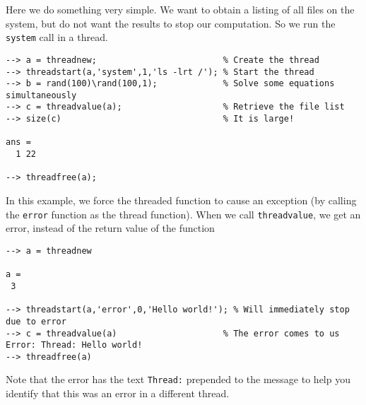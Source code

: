 Here we do something very simple.  We want to obtain a listing of
all files on the system, but do not want the results to stop our
computation.  So we run the \verb|system| call in a thread.
\begin{verbatim}
--> a = threadnew;                         % Create the thread
--> threadstart(a,'system',1,'ls -lrt /'); % Start the thread
--> b = rand(100)\rand(100,1);             % Solve some equations simultaneously
--> c = threadvalue(a);                    % Retrieve the file list
--> size(c)                                % It is large!

ans = 
  1 22 

--> threadfree(a);
\end{verbatim}
In this example, we force the threaded function to cause an
exception (by calling the \verb|error| function as the thread 
function).  When we call \verb|threadvalue|, we get an error, instead
of the return value of the function
\begin{verbatim}
--> a = threadnew

a = 
 3 

--> threadstart(a,'error',0,'Hello world!'); % Will immediately stop due to error
--> c = threadvalue(a)                     % The error comes to us
Error: Thread: Hello world!
--> threadfree(a)
\end{verbatim}
Note that the error has the text \verb|Thread:| prepended to the message
to help you identify that this was an error in a different thread.
